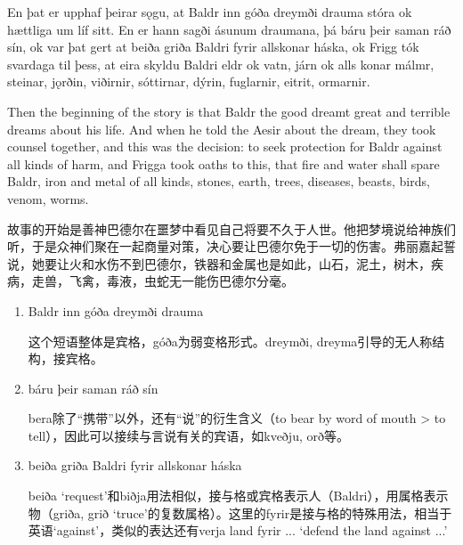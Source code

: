 \begin{paracol}{2}
  En þat er upphaf þeirar sǫgu, at Baldr inn góða dreymði drauma stóra ok hættliga um líf sitt. En er hann sagði ásunum draumana, þá báru þeir saman ráð sín, ok var þat gert at beiða griða Baldri fyrir allskonar háska, ok Frigg tók svardaga til þess, at eira skyldu Baldri eldr ok vatn, járn ok alls konar málmr, steinar, jǫrðin, viðirnir, sóttirnar, dýrin, fuglarnir, eitrit, ormarnir.

  \switchcolumn

  Then the beginning of the story is that Baldr the good dreamt great and terrible dreams about his life. And when he told the Aesir about the dream, they took counsel together, and this was the decision: to seek protection for Baldr against all kinds of harm, and Frigga took oaths to this, that fire and water shall spare Baldr, iron and metal of all kinds, stones, earth, trees, diseases, beasts, birds, venom, worms.
\end{paracol}
\begin{translation*}{}
  故事的开始是善神巴德尔在噩梦中看见自己将要不久于人世。他把梦境说给神族们听，于是众神们聚在一起商量对策，决心要让巴德尔免于一切的伤害。弗丽嘉起誓说，她要让火和水伤不到巴德尔，铁器和金属也是如此，山石，泥土，树木，疾病，走兽，飞禽，毒液，虫蛇无一能伤巴德尔分毫。
\end{translation*}
\begin{grammar*}{}
  \begin{enumerate}[leftmargin=*]
    \item Baldr inn góða dreymði drauma

          这个短语整体是宾格，góða为弱变格形式。dreymði, dreyma引导的无人称结构，接宾格。

    \item báru þeir saman ráð sín

          bera除了“携带”以外，还有“说”的衍生含义（to bear by word of mouth > to tell），因此可以接续与言说有关的宾语，如kveðju, orð等。

    \item beiða griða Baldri fyrir allskonar háska

          beiða `request'和biðja用法相似，接与格或宾格表示人（Baldri），用属格表示物（griða, grið `truce'的复数属格）。这里的fyrir是接与格的特殊用法，相当于英语`against'，类似的表达还有verja land fyrir ... `defend the land against ...'
  \end{enumerate}
\end{grammar*}

